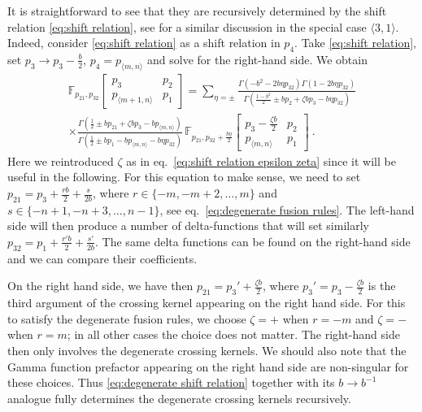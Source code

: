 \documentclass[12pt,a4paper]{article}
\begin{document}
It is straightforward to see that they are recursively determined by the shift relation \eqref{eq:shift relation}, see \cite{Nemkov:2021huu} for a similar discussion in the special case $\langle 3,1 \rangle$. Indeed, consider \eqref{eq:shift relation} as a shift relation in $p_4$. Take \eqref{eq:shift relation}, set $p_3 \to p_3-\frac{b}{2}$, $p_4=p_{\langle m,n \rangle}$ and solve for the right-hand side. We obtain
\begin{multline}
    \mathbb{F}_{p_{21},p_{32}} \!\begin{bmatrix}
    p_3 & p_2 \\
    p_{\langle m+1,n\rangle} & p_1
\end{bmatrix} =\sum_{\eta=\pm} \frac{ \Gamma(-b^2-2b \eta p_{32})\Gamma(1-2b \eta p_{32})}{\Gamma(\frac{1-b^2}{2}\pm b p_2+ \zeta b p_3-b \eta p_{32})} \\
\times \frac{\Gamma(\frac{1}{2} \pm b p_{21}+\zeta b  p_3-b p_{\langle m,n \rangle})}{\Gamma(\frac{1}{2} \pm b p_1-b p_{\langle m,n \rangle}- b \eta p_{32})}\, \mathbb{F}_{p_{21},p_{32}+\frac{b \eta}{2}}\!\begin{bmatrix}
    p_3-\frac{\zeta b}{2} & p_2 \\
    p_{\langle m,n \rangle} & p_1
\end{bmatrix} \ . \label{eq:degenerate shift relation}
\end{multline}
Here we reintroduced $\zeta$ as in eq.~\eqref{eq:shift relation epsilon zeta} since it will be useful in the following.
For this equation to make sense, we need to set $p_{21}=p_3+\frac{rb}{2}+\frac{s}{2b}$, where $r \in \{-m,-m+2,\dots,m\}$ and $s \in \{-n+1,-n+3,\dots,n-1\}$, see eq.~\eqref{eq:degenerate fusion rules}. The left-hand side will then produce a number of delta-functions that will set similarly $p_{32}=p_1+\frac{r'b}{2}+\frac{s'}{2b}$. The same delta functions can be found on the right-hand side and we can compare their coefficients.

On the right hand side, we have then $p_{21}=p_3'+\frac{\zeta b}{2}$, where $p_3'=p_3-\frac{\zeta b}{2}$ is the third argument of the crossing kernel appearing on the right hand side. For this to satisfy the degenerate fusion rules, we choose $\zeta=+$ when $r=-m$ and $\zeta=-$ when $r=m$; in all other cases the choice does not matter. The right-hand side then only involves the degenerate crossing kernels. We should also note that the Gamma function prefactor appearing on the right hand side are non-singular for these choices. Thus \eqref{eq:degenerate shift relation} together with its $b \to b^{-1}$ analogue fully determines the degenerate crossing kernels recursively.
\end{document}

